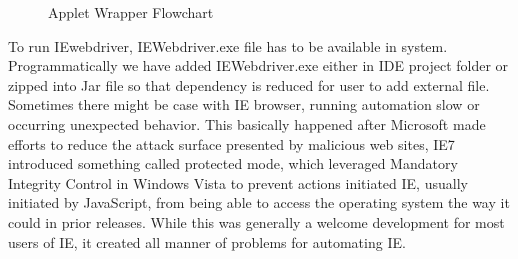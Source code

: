 \documentclass[article,type=msc,colorback,accentcolor=tud9c,twoside,11pt]{tudthesis}
\begin{document}
\begin{center}
\begin{figure}[h]
  \caption{Applet Wrapper Flowchart} 
  \label{fig:AppletwrapperAlgorithm}
\end{figure}
\end{center}
To run IEwebdriver, IEWebdriver.exe file has to be available in system. Programmatically we have added IEWebdriver.exe either in IDE project folder or zipped into Jar file so that dependency is reduced for user to add external file. Sometimes
there might be case with IE browser, running automation slow or occurring unexpected behavior. This basically happened after Microsoft made efforts to reduce the attack surface presented by malicious web sites, IE7 introduced something called protected mode, which leveraged Mandatory Integrity Control in Windows Vista to prevent actions initiated IE, usually initiated by JavaScript, from being able to access the operating system the way it could in prior releases. While this was generally a welcome development for most users of IE, it created all manner of problems for automating IE.
\end{document}
